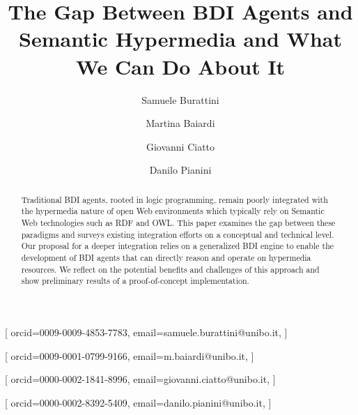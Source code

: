 \documentclass[
]{ceurart}
\begin{document}


\title{The Gap Between BDI Agents and Semantic Hypermedia and What We Can Do About It}


\author[1]{Samuele Burattini}[%
orcid=0009-0009-4853-7783,
email=samuele.burattini@unibo.it,
]
\cormark[1]
\fnmark[1]

\author[1]{Martina Baiardi}[%
orcid=0009-0001-0799-9166,
email=m.baiardi@unibo.it,
]
\fnmark[1]

\author[1]{Giovanni Ciatto}[%
orcid=0000-0002-1841-8996,
email=giovanni.ciatto@unibo.it,
]


\author[1]{Danilo Pianini}[%
orcid=0000-0002-8392-5409,
email=danilo.pianini@unibo.it,
]



\address[1]{\disi, \unibo}



\begin{abstract}
  Traditional BDI agents, 
  rooted in logic programming, 
  remain poorly integrated with the hypermedia nature of open Web environments
  which typically rely on Semantic Web technologies such as RDF and OWL.
  This paper examines the gap between these paradigms and surveys existing integration efforts on a conceptual and technical level.
  Our proposal for a deeper integration relies on a generalized BDI engine to enable the development of BDI agents that can directly reason and operate on hypermedia resources.
  We reflect on the potential benefits and challenges of this approach and show preliminary results of a proof-of-concept implementation.
\end{abstract}
\end{document}
